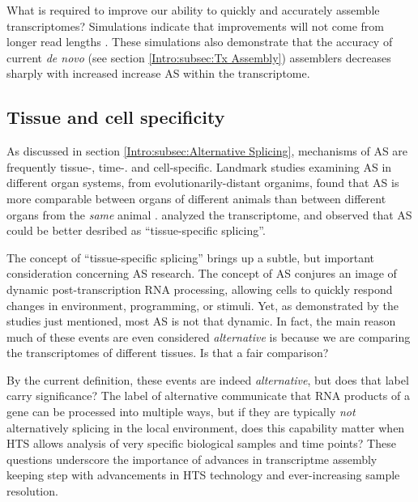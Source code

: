     What is required to improve our ability to quickly and accurately assemble transcriptomes? Simulations indicate that improvements will not come from longer read lengths \citep{Chang2014c}. These simulations also demonstrate that the accuracy of current \textit{de novo} (see section \ref{Intro:subsec:Tx Assembly}) assemblers decreases sharply with increased increase AS within the transcriptome.

  \subsection{Tissue and cell specificity}
    \label{Disc:subsec:Tissue-specific Tx expression}

    As discussed in section \ref{Intro:subsec:Alternative Splicing}, mechanisms of AS are frequently tissue-, time-. and cell-specific. Landmark studies examining AS in different organ systems, from evolutionarily-distant organims, found that AS is more comparable between organs of different animals than between different organs from the \textit{same} animal \citep{Barbosa-Morais2012,Merkin2012}. \citet{Brown2014} analyzed the \flies{} transcriptome, and observed that AS could be better desribed as ``tissue-specific splicing''. 

    The concept of ``tissue-specific splicing'' brings up a subtle, but important consideration concerning AS research. The concept of AS conjures an image of dynamic post-transcription RNA processing, allowing cells to quickly respond changes in environment, programming, or stimuli. Yet, as demonstrated by the studies just mentioned, most AS is not that dynamic. In fact, the main reason much of these events are even considered \textit{alternative} is because we are comparing the transcriptomes of different tissues. Is that a fair comparison?

    By the current definition, these events are indeed \textit{alternative}, but does that label carry significance? The label of alternative communicate that RNA products of a gene can be processed into multiple ways, but if they are typically \textit{not} alternatively splicing in the local environment, does this capability matter when HTS allows analysis of very specific biological samples and time points? These questions underscore the importance of advances in transcriptme assembly keeping step with advancements in HTS technology and ever-increasing sample resolution.


